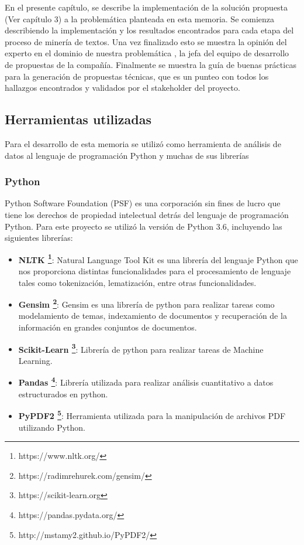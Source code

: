 
    En el presente capítulo, se describe la implementación de la solución propuesta (Ver capítulo 3) a la problemática planteada en esta memoria. Se comienza describiendo la implementación y los resultados encontrados para cada etapa del proceso de minería de textos. Una vez finalizado esto se muestra la opinión del experto en el dominio de nuestra problemática , la jefa del equipo de desarrollo de propuestas de la compañía. Finalmente se muestra la guía de buenas prácticas para la generación de propuestas técnicas, que es un punteo con todos los hallazgos encontrados y validados por el stakeholder del proyecto.
    
\subsection{Herramientas utilizadas}
    Para el desarrollo de esta memoria se utilizó como herramienta de análisis de datos al lenguaje de programación Python y muchas de sus librerías 
\subsubsection{Python}    
Python Software Foundation (PSF) es una corporación sin fines de lucro que
tiene los derechos de propiedad intelectual detrás del lenguaje de programación Python. Para este proyecto se utilizó la versión de Python 3.6, incluyendo las siguientes librerías:
    \begin{itemize}
        \item \textbf{NLTK \footnote{https://www.nltk.org/}}: Natural Language Tool Kit es una librería del lenguaje Python que nos proporciona distintas funcionalidades para el procesamiento de lenguaje tales como tokenización, lematización, entre otras funcionalidades.
        \item \textbf{Gensim \footnote{https://radimrehurek.com/gensim/}}: Gensim es una librería de python para realizar tareas como modelamiento de temas, indexamiento de documentos y recuperación de la información en grandes conjuntos de documentos. 
        \item \textbf{Scikit-Learn \footnote{https://scikit-learn.org}}: Librería de python para realizar tareas de Machine Learning.
        \item \textbf{Pandas \footnote{https://pandas.pydata.org/}}: Librería utilizada para realizar análisis cuantitativo a datos estructurados en python.
        \item \textbf{PyPDF2 \footnote{http://mstamy2.github.io/PyPDF2/}}: Herramienta utilizada para la manipulación de archivos PDF utilizando Python.
    \end{itemize}
            
